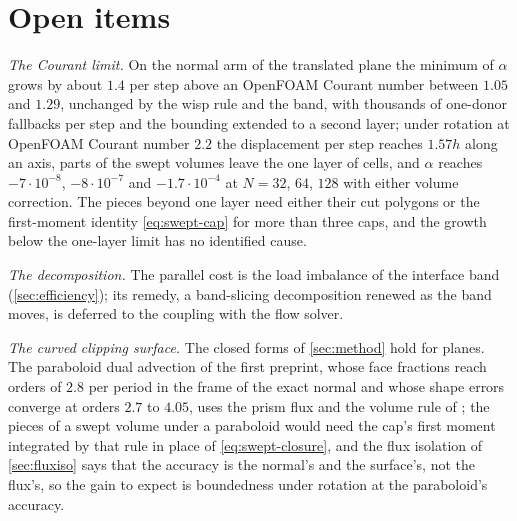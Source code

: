 \documentclass[preprint,12pt]{elsarticle}
\begin{document}
\section{Open items}
\label{sec:open}

\emph{The Courant limit.} On the normal arm of the translated plane the minimum of $\alpha$ grows by about $1.4$ per step above an OpenFOAM Courant number between $1.05$ and $1.29$, unchanged by the wisp rule and the band, with thousands of one-donor fallbacks per step and the bounding extended to a second layer; under rotation at OpenFOAM Courant number $2.2$ the displacement per step reaches $1.57h$ along an axis, parts of the swept volumes leave the one layer of cells, and $\alpha$ reaches $-7\cdot10^{-8}$, $-8\cdot10^{-7}$ and $-1.7\cdot10^{-4}$ at $N = 32$, $64$, $128$ with either volume correction. The pieces beyond one layer need either their cut polygons or the first-moment identity \cref{eq:swept-cap} for more than three caps, and the growth below the one-layer limit has no identified cause.

\emph{The decomposition.} The parallel cost is the load imbalance of the interface band (\cref{sec:efficiency}); its remedy, a band-slicing decomposition renewed as the band moves, is deferred to the coupling with the flow solver.

\emph{The curved clipping surface.} The closed forms of \cref{sec:method} hold for planes. The paraboloid dual advection of the first preprint, whose face fractions reach orders of $2.8$ per period in the frame of the exact normal and whose shape errors converge at orders $2.7$ to $4.05$, uses the prism flux and the volume rule of \citet{KromerBothe2023Init}; the pieces of a swept volume under a paraboloid would need the cap's first moment integrated by that rule in place of \cref{eq:swept-closure}, and the flux isolation of \cref{sec:fluxiso} says that the accuracy is the normal's and the surface's, not the flux's, so the gain to expect is boundedness under rotation at the paraboloid's accuracy.
\end{document}
